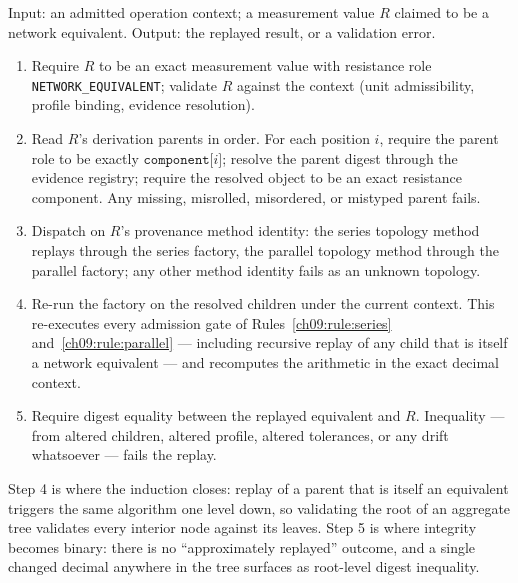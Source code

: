 \begin{algorithm}\label{ch09:alg:replay}
Input: an admitted operation context; a measurement value $R$ claimed to
be a network equivalent. Output: the replayed result, or a validation
error.
\begin{enumerate}
\item Require $R$ to be an exact measurement value with resistance role
\texttt{NETWORK\_EQUIVALENT}; validate $R$ against the context (unit
admissibility, profile binding, evidence resolution).
\item Read $R$'s derivation parents in order. For each position $i$,
require the parent role to be exactly $\texttt{component[}i\texttt{]}$;
resolve the parent digest through the evidence registry; require the
resolved object to be an exact resistance component. Any missing,
misrolled, misordered, or mistyped parent fails.
\item Dispatch on $R$'s provenance method identity: the series topology
method replays through the series factory, the parallel topology method
through the parallel factory; any other method identity fails as an
unknown topology.
\item Re-run the factory on the resolved children under the current
context. This re-executes every admission gate of
Rules~\ref{ch09:rule:series} and~\ref{ch09:rule:parallel} --- including
recursive replay of any child that is itself a network equivalent ---
and recomputes the arithmetic in the exact decimal context.
\item Require digest equality between the replayed equivalent and $R$.
Inequality --- from altered children, altered profile, altered
tolerances, or any drift whatsoever --- fails the replay.
\end{enumerate}
\end{algorithm}

Step 4 is where the induction closes: replay of a parent that is itself
an equivalent triggers the same algorithm one level down, so validating
the root of an aggregate tree validates every interior node against its
leaves. Step 5 is where integrity becomes binary: there is no
``approximately replayed'' outcome, and a single changed decimal
anywhere in the tree surfaces as root-level digest inequality.

